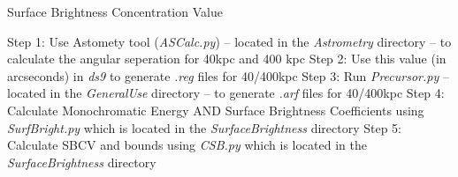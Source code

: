 \documentclass[11pt,letterpaper]{article}
\begin{document}
\begin{algorithm}[H]\label{algo:BA}
	\caption{Surface Brightness Concentration Value}
	Step 1: Use Astomety tool (\textit{ASCalc.py}) -- located in the \textit{Astrometry} directory -- to calculate the angular seperation for 40kpc and 400 kpc\;
	Step 2: Use this value (in arcseconds) in \textit{ds9} to generate \textit{.reg} files for 40/400kpc\;
	Step 3: Run \textit{Precursor.py} -- located in the \textit{GeneralUse} directory -- to generate \textit{.arf} files for 40/400kpc\;
	Step 4: Calculate Monochromatic Energy AND Surface Brightness Coefficients using \textit{SurfBright.py} which is located in the \textit{SurfaceBrightness} directory\;
	Step 5: Calculate SBCV and bounds using \textit{CSB.py} which is located in the \textit{SurfaceBrightness} directory\;
\end{algorithm}



\newpage




\end{document}
